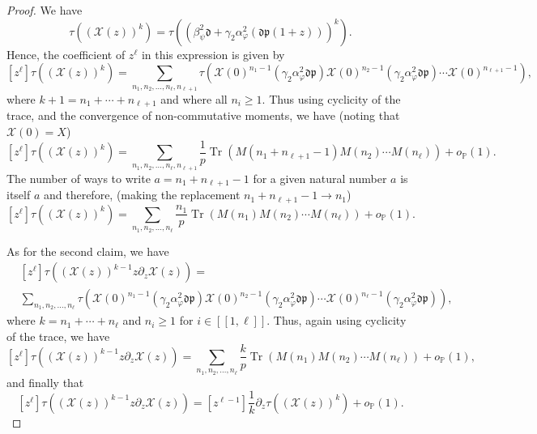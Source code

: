 \documentclass[letterpaper, 10pt, dvipsnames]{article}
\numberwithin{equation}{section}
\DeclareMathOperator{\Tr}{Tr}
\renewcommand{\phi}{\varphi}
\renewcommand{\P}{\mathds{P}}
\newcommand{\unn}[2]{[\![#1,#2]\!]}
\theoremstyle{definition}
\begin{document}
\begin{proof}
  We have 
  \[
  \tau(\left( \mathcal{X}(z) \right)^k) = \tau\left(    
    \left(
      \beta_\psi^2 \mathfrak{d} + {\gamma_2\alpha_\phi^2}\left( \mathfrak{d}\mathfrak{p}(1+z) \right)
    \right)^k
  \right).  
  \]
  Hence, the coefficient of $z^\ell$ in this expression is given by 
  \[
  [z^\ell]\tau(\left( \mathcal{X}(z) \right)^k) 
  = \sum_{n_1,n_2,\dots,n_\ell,n_{\ell+1}}
  \tau\left(
    \mathcal{X}(0)^{n_1-1} 
    \left(
      \gamma_2\alpha_\phi^2
      \mathfrak{d}\mathfrak{p}
    \right)
    \mathcal{X}(0)^{n_2-1} 
    \left(
      \gamma_2\alpha_\phi^2
      \mathfrak{d}\mathfrak{p}
    \right)
    \cdots 
    \mathcal{X}(0)^{n_{\ell+1}-1} 
  \right),
  \]
  where $k+1 = n_1+\cdots+n_{\ell+1}$ and where all $n_i \geq 1$.
  Thus using cyclicity of the trace, and the convergence of non-commutative moments, we have (noting that $\mathcal{X}(0) = X$)
  \[
  [z^\ell]\tau(\left( \mathcal{X}(z) \right)^k) 
  =
  \sum_{n_1,n_2,\dots,n_\ell,n_{\ell+1}} \frac{1}{p} \Tr( M(n_1+n_{\ell+1}-1)M(n_2)\cdots M(n_\ell)) + o_{\P}(1).
  \]
  The number of ways to write $a=n_1+n_{\ell+1}-1$ for a given natural number $a$ is itself $a$ and therefore, (making the replacement $n_1+n_{\ell+1}-1 \to n_1$) 
  \[
    [z^\ell]\tau(\left( \mathcal{X}(z) \right)^k) = 
    \sum_{n_1,n_2,\dots,n_\ell} 
    \frac{n_1}{p} \Tr( M(n_1)M(n_2)\cdots M(n_\ell)) + o_{\P}(1).
  \]

  As for the second claim, we have 
  \[
  \begin{aligned}
    &[z^\ell]\tau(\left( \mathcal{X}(z) \right)^{k-1} z \partial_z \mathcal{X}(z)) = \\
    &\sum_{n_1,n_2,\dots,n_\ell}
    \tau\left(
      \mathcal{X}(0)^{n_1-1} 
      \left(
        \gamma_2\alpha_\phi^2
        \mathfrak{d}\mathfrak{p}
      \right)
      \mathcal{X}(0)^{n_2-1} 
      \left(
        \gamma_2\alpha_\phi^2
        \mathfrak{d}\mathfrak{p}
      \right)
      \cdots 
      \mathcal{X}(0)^{n_{\ell}-1}   
      \left(
        \gamma_2\alpha_\phi^2
        \mathfrak{d}\mathfrak{p}
      \right)
    \right),
    \end{aligned}
\]
where $k = n_1+\cdots+n_\ell$ and $n_i \geq 1$ for $i \in \unn{1}{\ell}$.
Thus, again using cyclicity of the trace, we have 
\[
  [z^\ell]\tau(\left( \mathcal{X}(z) \right)^{k-1} z \partial_z \mathcal{X}(z)) = 
  \sum_{n_1,n_2,\dots,n_\ell} 
  \frac{k}{p} \Tr( M(n_1)M(n_2)\cdots M(n_\ell)) + o_{\P}(1),
\]
and finally that  
\[
  [z^\ell]\tau(\left( \mathcal{X}(z) \right)^{k-1} z \partial_z \mathcal{X}(z)) = 
  [z^{\ell-1}]\frac{1}{k} \partial_z \tau(\left( \mathcal{X}(z) \right)^k) + o_{\P}(1).
\]
\end{proof}
\end{document}
